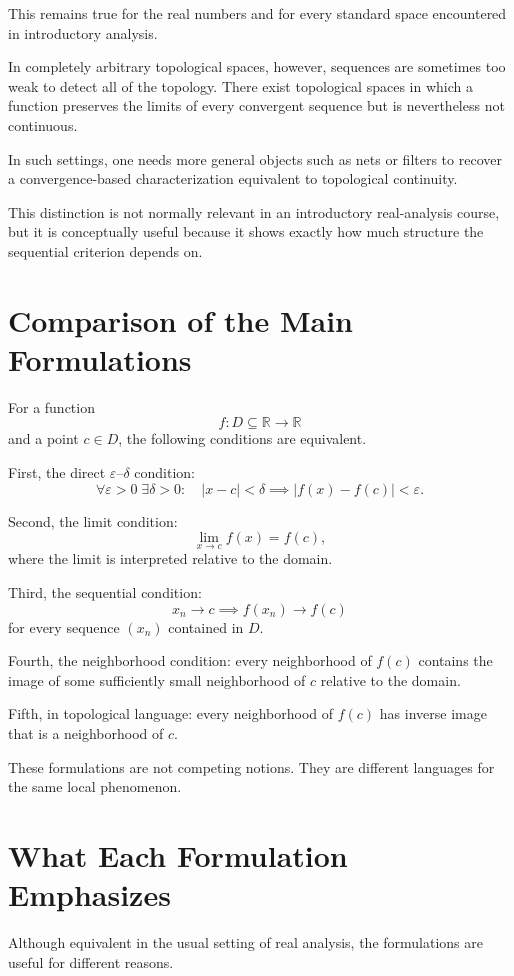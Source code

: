 \documentclass{essay}
\begin{document}
This remains true for the real numbers and for every standard space encountered in introductory analysis.

In completely arbitrary topological spaces, however, sequences are sometimes too weak to detect all of the topology. There exist topological spaces in which a function preserves the limits of every convergent sequence but is nevertheless not continuous.

In such settings, one needs more general objects such as nets or filters to recover a convergence-based characterization equivalent to topological continuity.

This distinction is not normally relevant in an introductory real-analysis course, but it is conceptually useful because it shows exactly how much structure the sequential criterion depends on.

\section{Comparison of the Main Formulations}

For a function
\[ f:D\subseteq\mathbb{R}\to\mathbb{R} \]
and a point \(c\in D\), the following conditions are equivalent.

First, the direct \(\varepsilon\)--\(\delta\) condition:
\[ \forall\varepsilon>0\;\exists\delta>0: \quad |x-c|<\delta \implies |f(x)-f(c)|<\varepsilon. \]

Second, the limit condition:
\[ \lim_{x\to c}f(x)=f(c), \]
where the limit is interpreted relative to the domain.

Third, the sequential condition:
\[ x_{n}\to c \implies f(x_{n})\to f(c) \]
for every sequence \((x_{n})\) contained in \(D\).

Fourth, the neighborhood condition: every neighborhood of \(f(c)\) contains the image of some sufficiently small neighborhood of \(c\) relative to the domain.

Fifth, in topological language: every neighborhood of \(f(c)\) has inverse image that is a neighborhood of \(c\).

These formulations are not competing notions. They are different languages for the same local phenomenon.

\section{What Each Formulation Emphasizes}

Although equivalent in the usual setting of real analysis, the formulations are useful for different reasons.
\end{document}
